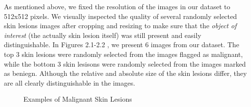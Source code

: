 \documentclass [MAS] {uclathes}
\begin{document}
As mentioned above, we fixed the resolution of the images in our dataset to 512x512 pixels. We visually inspected the quality of several randomly selected skin lesions images after cropping and resizing to make sure that the \textit{object of interest} (the actually skin lesion itself) was still present and easily distinguishable. In Figures 2.1-2.2 , we present 6 images from our dataset. The top 3 skin lesions were randomly selected from the images flagged as malignant, while the bottom 3 skin lesisons were randomly selected from the images marked as beniegn. Although the relative and absolute size of the skin lesions differ, they are all clearly distinguishable in the images. 

\begin{figure}[hbt!]
\hspace*{\fill}
\centering
{}\hspace{0.5em}
\hspace{0.5em}
\hspace*{\fill}
\label{fig:mel_examples}
\vspace{-1cm}
\caption{Examples of Malignant Skin Lesions}
\end{figure}
\end{document}
